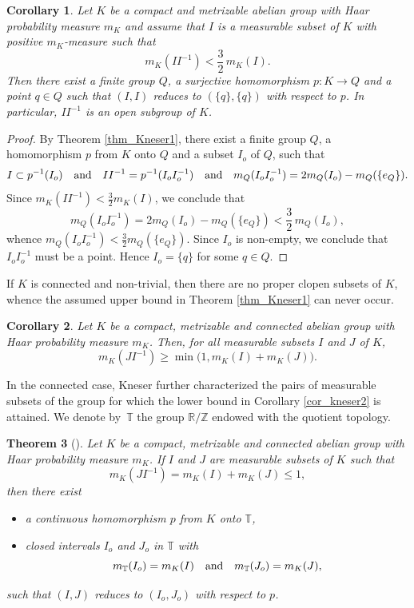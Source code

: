 \documentclass[JEP,XML,SOM,Unicode]{cedram}
\newcommand{\bR}{\mathbb{R}}
\newcommand{\bT}{\mathbb{T}}
\newcommand{\bZ}{\mathbb{Z}}
\newcommand{\qand}{\quad\textup{and}\quad}
\theoremstyle{plain}
\newtheorem{theorem}{Theorem}[section]
\newtheorem{corollary}[theorem]{Corollary}
\theoremstyle{definition}
\begin{document}
\begin{corollary}
\label{cor_kneser1}
Let $K$ be a compact and metrizable abelian group with Haar probability measure $m_K$ and assume that $I$ is a measurable
subset of $K$ with positive $m_K$-measure such that
\[
m_K(II^{-1}) < \frac{3}{2}\, m_K(I).
\]
Then there exist a finite group $Q$, a surjective homomorphism $p : K \to Q$ and a point $q \in Q$ such that $(I,I)$ reduces
to $(\{q\},\{q\})$ with respect to $p$. In particular, $II^{-1}$ is an open subgroup of $K$.
\end{corollary}

\begin{proof}
By Theorem \ref{thm_Kneser1}, there exist a finite group $Q$, a homomorphism $p$ from $K$ onto $Q$ and
a subset $I_o$ of $Q$, such that
\[
I \subset p^{-1}(I_o) \qand II^{-1} = p^{-1}(I_o I_o^{-1}) \qand m_Q(I_o I_o^{-1}) = 2m_Q(I_o) - m_Q(\{e_Q\}).
\]
Since $m_K(II^{-1}) < \frac{3}{2} m_K(I)$, we conclude that
\begin{equation}
\label{Qbnd}
m_Q(I_o I_o^{-1}) = 2m_Q(I_o) - m_Q(\{e_Q\}) < \frac{3}{2}\, m_Q(I_o),
\end{equation}
whence $m_Q(I_o I_o^{-1}) < \frac{3}{2} m_Q(\{e_Q\})$. Since $I_o$ is non-empty, we conclude that $I_o I_o^{-1}$ must be a
point. Hence $I_o = \{q\}$ for some $q \in Q$.
\end{proof}

If $K$ is connected and non-trivial, then there are no proper clopen subsets of $K$, whence the assumed upper bound in Theorem \ref{thm_Kneser1}
can never occur.

\begin{corollary}
\label{cor_kneser2}
Let $K$ be a compact, metrizable and connected abelian group with Haar probability measure $m_K$. Then, for all measurable subsets
$I$ and $J$ of $K$,
\[
m_K(JI^{-1}) \geq \min\bigl(1,m_K(I) + m_K(J)\bigr).
\]
\end{corollary}

In the connected case, Kneser further characterized the pairs of measurable subsets of the group for which the lower bound in Corollary \eqref{cor_kneser2}
is attained. We denote by~$\bT$ the group $\bR/\bZ$ endowed with the quotient topology.

\begin{theorem}[{\cite[Satz\,2]{Kneser}}]
\label{thm_Kneser2}
Let $K$ be a compact, metrizable and connected abelian group with Haar probability measure $m_K$. If $I$ and $J$ are measurable
subsets of $K$ such that
\[
m_K(JI^{-1}) = m_K(I) + m_K(J) \leq 1,
\]
then there exist

\begin{itemize}
\item a continuous homomorphism $p$ from $K$ onto $\bT$,
\item closed intervals $I_o$ and $J_o$ in $\bT$ with
\[
m_\bT(I_o) = m_K(I) \qand m_{\bT}(J_o) = m_{K}(J),
\]
\end{itemize}
such that $(I,J)$ reduces to $(I_o,J_o)$ with respect to $p$.
\end{theorem}
\end{document}
